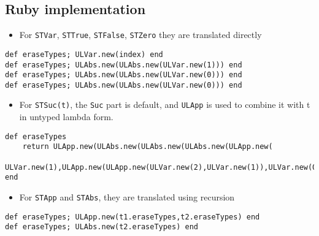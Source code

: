 \documentclass[11pt]{article}
\begin{document}
\subsection{Ruby implementation}
\label{sec:org5358304}
\begin{itemize}
\item For \texttt{STVar}, \texttt{STTrue}, \texttt{STFalse}, \texttt{STZero} they are translated directly
\end{itemize}
\begin{verbatim}
def eraseTypes; ULVar.new(index) end
def eraseTypes; ULAbs.new(ULAbs.new(ULVar.new(1))) end
def eraseTypes; ULAbs.new(ULAbs.new(ULVar.new(0))) end
def eraseTypes; ULAbs.new(ULAbs.new(ULVar.new(0))) end
\end{verbatim}

\begin{itemize}
\item For \texttt{STSuc(t)}, the \texttt{Suc} part is default, and \texttt{ULApp} is used to combine it with t in untyped lambda form.
\end{itemize}
\begin{verbatim}
def eraseTypes
    return ULApp.new(ULAbs.new(ULAbs.new(ULAbs.new(ULApp.new(
      ULVar.new(1),ULApp.new(ULApp.new(ULVar.new(2),ULVar.new(1)),ULVar.new(0)))))),t.eraseTypes) 
end
\end{verbatim}

\begin{itemize}
\item For \texttt{STApp} and \texttt{STAbs}, they are translated using recursion
\end{itemize}
\begin{verbatim}
def eraseTypes; ULApp.new(t1.eraseTypes,t2.eraseTypes) end
def eraseTypes; ULAbs.new(t2.eraseTypes) end
\end{verbatim}
\end{document}
